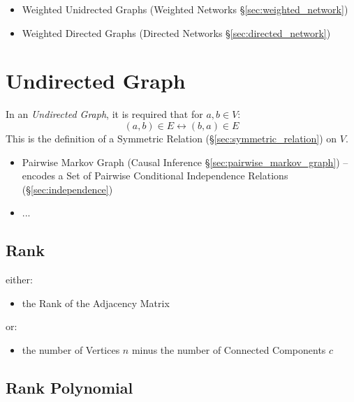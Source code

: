 \begin{itemize}
  \item Weighted Unidrected Graphs (Weighted Networks
    \S\ref{sec:weighted_network})
  \item Weighted Directed Graphs (Directed Networks
    \S\ref{sec:directed_network})
\end{itemize}



\section{Undirected Graph}\label{sec:undirected_graph}

In an \emph{Undirected Graph}, it is required that for $a,b \in V$:
\[
    (a,b) \in E \leftrightarrow (b,a) \in E
\]
This is the definition of a Symmetric Relation
(\S\ref{sec:symmetric_relation}) on $V$.

\begin{itemize}
  \item Pairwise Markov Graph (Causal Inference
    \S\ref{sec:pairwise_markov_graph}) -- encodes a Set of Pairwise Conditional
    Independence Relations (\S\ref{sec:independence})
  \item ...
\end{itemize}



\subsection{Rank}\label{sec:graph_rank}

either:
\begin{itemize}
  \item the Rank of the Adjacency Matrix
\end{itemize}
or:
\begin{itemize}
  \item the number of Vertices $n$ minus the number of Connected Components $c$
\end{itemize}



\subsection{Rank Polynomial}\label{sec:rank_polynomial}



